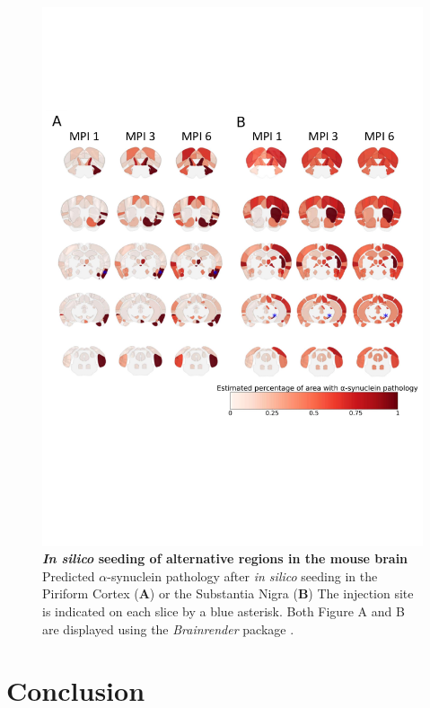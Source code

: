 \begin{figure}[!h]
    \includegraphics[width=\linewidth]{Figures/Fig3.pdf}

    \caption{\textbf{\textit{In silico} seeding of alternative regions in the mouse brain} 
    Predicted $\alpha$-synuclein pathology after \textit{in silico} seeding in the Piriform Cortex (\textbf{A}) or the Substantia Nigra (\textbf{B}) The injection site is indicated on each slice by a blue asterisk. Both Figure A and B are displayed using the \textit{Brainrender} package \cite{Claudi_2021}.}
    \label{fig:fig3}
\end{figure}
    
\section{Conclusion}

